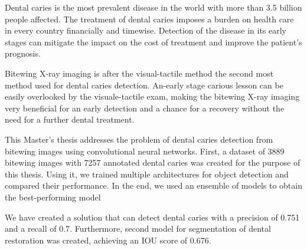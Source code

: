 
\ctuprocess

\begin{abstract-english}
Dental caries is the most prevalent disease in the world with more than 3.5 billion people affected. The treatment of dental caries imposes a burden on health care in every country financially and timewise. Detection of the disease in its early stages can mitigate the impact on the cost of treatment and improve the patient's prognosis.

Bitewing X-ray imaging is after the visual-tactile method the second most method used for dental caries detection. An-early stage carious lesson can be easily overlooked by the visuale-tactile exam, making the bitewing X-ray imaging very beneficial for an early detection and a chance for a recovery without the need for a further dental treatment.

This Master's thesis addresses the problem of dental caries detection from bitewing images using convolutional neural networks. First, a dataset of 3889 bitewing images with 7257 annotated dental caries was created for the purpose of this thesis. Using it, we trained multiple architectures for object detection and compared their performance. In the end, we used an ensemble of models to obtain the best-performing model


We have created a solution that can detect dental caries with a precision of 0.751 and a recall of 0.7. Furthermore, second model for segmentation of dental restoration was created, achieving an IOU score of 0.676.
\end{abstract-english}

